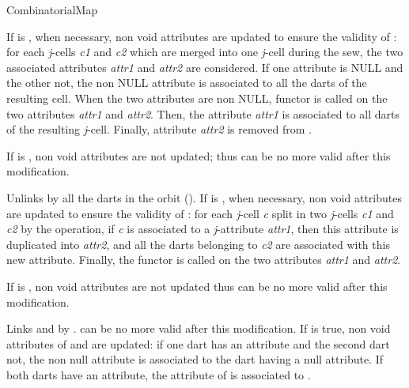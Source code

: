 \begin{ccRefConcept}{CombinatorialMap}
{  If  is , when necessary, non void
  attributes are updated to ensure the validity of : for each
  \emph{j}-cells \emph{c1} and \emph{c2} which are merged into one \emph{j}-cell during
  the sew, the two associated attributes \emph{attr1} and \emph{attr2} are
  considered.  If one attribute is
  NULL and the other not, the non NULL attribute is associated to all
  the darts of the resulting cell.  When the two attributes are non
  NULL, functor  is called on
  the two attributes \emph{attr1} and \emph{attr2}. Then, the attribute
  \emph{attr1} is associated to all darts of the resulting
  \emph{j}-cell. Finally, attribute \emph{attr2} is removed from .
  \begin{ccAdvanced}
    If  is , non void attributes are
    not updated; thus  can be no more valid after this
    modification.
  \end{ccAdvanced}
}

 {Unlinks by \betai{} all the darts in the
  orbit
  \orbit{\betaun{},$\ldots$,\betaimdeux{},\betaipdeux{},$\ldots$,\betad{}}().  If
   is , when necessary, non void
  attributes are updated to ensure the validity of : for each
  \emph{j}-cell \emph{c} split in two \emph{j}-cells \emph{c1} and \emph{c2} by the
  operation, if \emph{c} is associated to a \emph{j}-attribute \emph{attr1}, then
  this attribute is duplicated into \emph{attr2}, and all the darts
  belonging to \emph{c2} are associated with this new attribute.  Finally,
  the functor  is called on the
  two attributes \emph{attr1} and \emph{attr2}.
\begin{ccAdvanced}
  If  is , non void attributes are
  not updated thus  can be no more valid after this
  modification. 
\end{ccAdvanced}}

\begin{ccAdvanced}

{Links  and   by \betai{}. 
   can be no more valid after this modification.  If
   is true, non void attributes of  and
   are updated: if one dart has an attribute and the second
  dart not, the non null attribute is associated to the dart having a null attribute. 
  If both darts have an attribute, 
  the attribute of  is associated to .
  }



\end{ccAdvanced}
\end{ccRefConcept}
